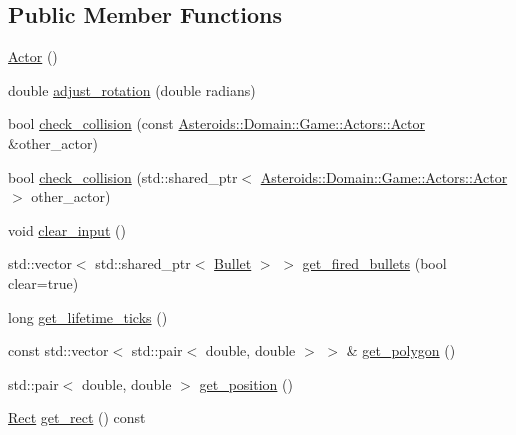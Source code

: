 \subsection*{Public Member Functions}
\begin{DoxyCompactItemize}
\item 
\hyperlink{classAsteroids_1_1Domain_1_1Game_1_1Actors_1_1Actor_a7be8857a93e88d79c6cf1bcc4b1dcdb4}{Actor} ()
\item 
double \hyperlink{classAsteroids_1_1Domain_1_1Game_1_1Actors_1_1Actor_a632126e3d3b8bd311737ca59b623ab7e}{adjust\+\_\+rotation} (double radians)
\item 
bool \hyperlink{classAsteroids_1_1Domain_1_1Game_1_1Actors_1_1Actor_a80d8992f00d8e0056d0287e6076c22a4}{check\+\_\+collision} (const \hyperlink{classAsteroids_1_1Domain_1_1Game_1_1Actors_1_1Actor}{Asteroids\+::\+Domain\+::\+Game\+::\+Actors\+::\+Actor} \&other\+\_\+actor)
\item 
bool \hyperlink{classAsteroids_1_1Domain_1_1Game_1_1Actors_1_1Actor_aa9baec5098ef0bcc7bb8675881919c7f}{check\+\_\+collision} (std\+::shared\+\_\+ptr$<$ \hyperlink{classAsteroids_1_1Domain_1_1Game_1_1Actors_1_1Actor}{Asteroids\+::\+Domain\+::\+Game\+::\+Actors\+::\+Actor} $>$ other\+\_\+actor)
\item 
void \hyperlink{classAsteroids_1_1Domain_1_1Game_1_1Actors_1_1Actor_a3678c27cfb63d8b4eb9b0aa64e352ee1}{clear\+\_\+input} ()
\item 
std\+::vector$<$ std\+::shared\+\_\+ptr$<$ \hyperlink{classAsteroids_1_1Domain_1_1Game_1_1Actors_1_1Bullet}{Bullet} $>$ $>$ \hyperlink{classAsteroids_1_1Domain_1_1Game_1_1Actors_1_1Actor_a85f975b2236c7615a1db179cfe7694f0}{get\+\_\+fired\+\_\+bullets} (bool clear=true)
\item 
long \hyperlink{classAsteroids_1_1Domain_1_1Game_1_1Actors_1_1Actor_a4e096daf30dca67bcd500fcae7e80979}{get\+\_\+lifetime\+\_\+ticks} ()
\item 
const std\+::vector$<$ std\+::pair$<$ double, double $>$ $>$ \& \hyperlink{classAsteroids_1_1Domain_1_1Game_1_1Actors_1_1Actor_a8c78eaf91bff447a07b24708478ed0d8}{get\+\_\+polygon} ()
\item 
std\+::pair$<$ double, double $>$ \hyperlink{classAsteroids_1_1Domain_1_1Game_1_1Actors_1_1Actor_ae22e20b86f0f95b334cc64d5a9b14c99}{get\+\_\+position} ()
\item 
\hyperlink{classAsteroids_1_1Domain_1_1Game_1_1Actors_1_1Rect}{Rect} \hyperlink{classAsteroids_1_1Domain_1_1Game_1_1Actors_1_1Actor_a445d9ee9ca02625b5385727aa4cbab1b}{get\+\_\+rect} () const

\end{DoxyCompactItemize}
